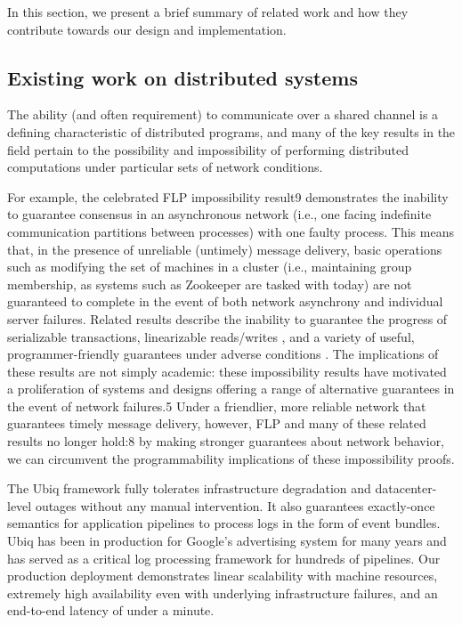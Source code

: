 \label{sec:related}
In this section, we present a brief summary of related work and how they contribute towards
our design and implementation.


\subsection{Existing work on distributed systems}

The ability (and often requirement) to communicate over a shared channel is a defining characteristic of distributed
programs, and many of the key results in the field pertain to the possibility and impossibility of performing
distributed computations under particular sets of network conditions.

For example, the celebrated FLP impossibility result9 demonstrates the inability to guarantee consensus in an
asynchronous network (i.e., one facing indefinite communication partitions between processes) with one faulty process.
This means that, in the presence of unreliable (untimely) message delivery, basic operations such as modifying the set
of machines in a cluster (i.e., maintaining group membership, as systems such as Zookeeper are tasked with today) are
not guaranteed to complete in the event of both network asynchrony and individual server failures. Related results
describe the inability to guarantee the progress of serializable transactions\cite{Davidson1985}, linearizable
reads/writes \cite{Gilbert2002}, and a variety of useful, programmer-friendly guarantees under adverse conditions
\cite{Bailis2013}. The implications of these results are not simply academic: these impossibility results have motivated
a proliferation of systems and designs offering a range of alternative guarantees in the event of network failures.5
Under a friendlier, more reliable network that guarantees timely message delivery, however, FLP and many of these
related results no longer hold:8 by making stronger guarantees about network behavior, we can circumvent the
programmability implications of these impossibility proofs.

The Ubiq \cite{ubiq}framework fully tolerates infrastructure degradation and datacenter-level outages without any manual
intervention. It also guarantees exactly-once semantics for application pipelines to process logs in the form of event
bundles. Ubiq has been in production for Google’s advertising system for many years and has served as a critical log
processing framework for hundreds of pipelines. Our production deployment demonstrates linear scalability with machine
resources, extremely high availability even with underlying infrastructure failures, and an end-to-end latency of under
a minute.

